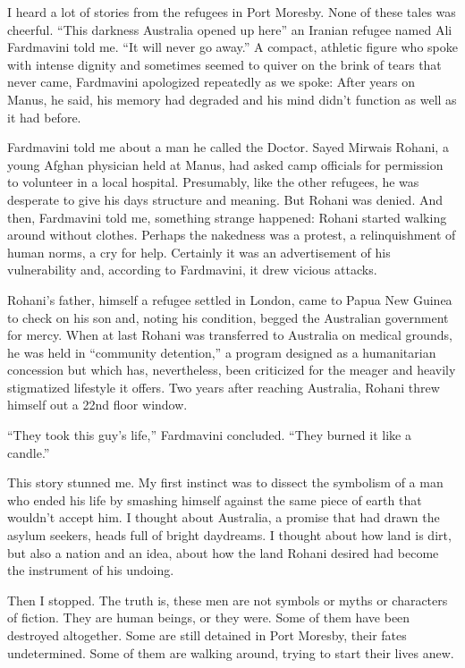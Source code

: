 I heard a lot of stories from the refugees in Port Moresby. None of
these tales was cheerful. ``This darkness Australia opened up here'' an
Iranian refugee named Ali Fardmavini told me. ``It will never go away.''
A compact, athletic figure who spoke with intense dignity and sometimes
seemed to quiver on the brink of tears that never came, Fardmavini
apologized repeatedly as we spoke: After years on Manus, he said, his
memory had degraded and his mind didn't function as well as it had
before.

Fardmavini told me about a man he called the Doctor. Sayed Mirwais
Rohani, a young Afghan physician held at Manus, had asked camp officials
for permission to volunteer in a local hospital. Presumably, like the
other refugees, he was desperate to give his days structure and meaning.
But Rohani was denied. And then, Fardmavini told me, something strange
happened: Rohani started walking around without clothes. Perhaps the
nakedness was a protest, a relinquishment of human norms, a cry for
help. Certainly it was an advertisement of his vulnerability and,
according to Fardmavini, it drew vicious attacks.

Rohani's father, himself a refugee settled in London, came to Papua New
Guinea to check on his son and, noting his condition, begged the
Australian government for mercy. When at last Rohani was transferred to
Australia on medical grounds, he was held in ``community detention,'' a
program designed as a humanitarian concession but which has,
nevertheless, been criticized for the meager and heavily stigmatized
lifestyle it offers. Two years after reaching Australia, Rohani threw
himself out a 22nd floor window.

``They took this guy's life,'' Fardmavini concluded. ``They burned it
like a candle.''

This story stunned me. My first instinct was to dissect the symbolism of
a man who ended his life by smashing himself against the same piece of
earth that wouldn't accept him. I thought about Australia, a promise
that had drawn the asylum seekers, heads full of bright daydreams. I
thought about how land is dirt, but also a nation and an idea, about how
the land Rohani desired had become the instrument of his undoing.

Then I stopped. The truth is, these men are not symbols or myths or
characters of fiction. They are human beings, or they were. Some of them
have been destroyed altogether. Some are still detained in Port Moresby,
their fates undetermined. Some of them are walking around, trying to
start their lives anew.


